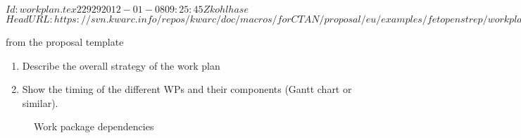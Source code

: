 \svnInfo $Id: workplan.tex 22929 2012-01-08 09:25:45Z kohlhase $
\svnKeyword $HeadURL: https://svn.kwarc.info/repos/kwarc/doc/macros/forCTAN/proposal/eu/examples/fetopenstrep/workplan.tex $

\begin{todo}{from the proposal template}
\begin{enumerate}
\item Describe the overall strategy of the work plan
\item Show the timing of the different WPs and their components (Gantt chart or similar).
\end{enumerate}
\end{todo}
\begin{figure}
  \caption{Work package dependencies}
  \label{fig:wp-deps}
\end{figure}

\ganttchart[draft,xscale=.45] 



